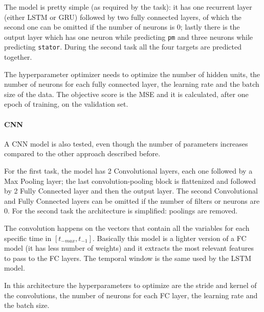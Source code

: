 The model is pretty simple (as required by the task): it has one recurrent layer (either LSTM or GRU) followed by two fully connected layers, of which the second one can be omitted if the number of neurons is 0; lastly there is the output layer which has one neuron while predicting \verb|pm| and three neurons while predicting \verb|stator|.
During the second task all the four targets are predicted together.

The hyperparameter optimizer needs to optimize the number of hidden units, the number of neurons for each fully connected layer, the learning rate and the batch size of the data.
The objective score is the MSE and it is calculated, after one epoch of training, on the validation set.

\paragraph{CNN}
A CNN model is also tested, even though the number of parameters increases compared to the other approach described before.

For the first task, the model has 2 Convolutional layers, each one followed by a Max Pooling layer; the last convolution-pooling block is flattenized and followed by 2 Fully Connected layer and then the output layer. The second Convolutional and Fully Connected layers can be omitted if the number of filters or neurons are 0. For the second task the architecture is simplified: poolings are removed.
 
The convolution happens on the vectors that contain all the variables for each specific time in %
$[t_{-max}, t_{-1}]$.
Basically this model is a lighter version of a FC model (it has less number of weights) and it extracts the most relevant features to pass to the FC layers.
The temporal window is the same used by the LSTM model.

In this architecture the hyperparameters to optimize are the stride and kernel of the convolutions, the number of neurons for each FC layer, the learning rate and the batch size.

